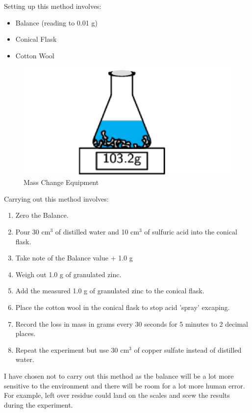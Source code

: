 Setting up this method involves:
\begin{itemize}
\item Balance (reading to 0.01 g)
\item Conical Flask
\item Cotton Wool
\end{itemize}

\begin{figure}[H]
    \includegraphics[width=\textwidth]{./Planning/Images/MassChange.pdf}
    \caption{Mass Change Equipment} \label{fig:Mass Change}
\end{figure}


Carrying out this method involves:

\begin{enumerate}
\item Zero the Balance.
\item Pour 30 cm$^3$ of distilled water and 10 cm$^3$ of sulfuric acid into the conical flask.
\item Take note of the Balance value + 1.0 g
\item Weigh out 1.0 g of granulated zinc.
\item Add the measured 1.0 g of granulated zinc to the conical flask.
\item Place the cotton wool in the conical flask to stop acid 'spray' excaping.
\item Record the loss in mass in grams every 30 seconds for 5 minutes to 2 decimal places.
\item Repeat the experiment but use 30 cm$^3$ of copper sulfate instead of distilled water.
\end{enumerate} 

I have chosen not to carry out this method as the balance will be a lot more sensitive to the environment and there will be room for a lot more human error. For example, left over residue could land on the scales and scew the results during the experiment. 


